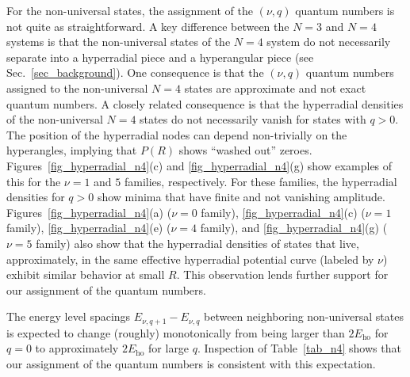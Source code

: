 \documentclass[aps,pra,twocolumn,showpacs,superscriptaddress]{revtex4}
\begin{document}
For the non-universal states,
the assignment of the $(\nu,q)$ quantum numbers is
not quite as straightforward.
A key difference between the $N=3$ and $N=4$ systems is that
the non-universal states of the $N=4$ system do not
necessarily separate into a hyperradial piece and a hyperangular
piece (see Sec.~\ref{sec_background}).
One consequence is that the $(\nu,q)$
quantum numbers assigned to the non-universal
$N=4$ states are approximate
and not exact quantum numbers.
A closely related  consequence
is that the hyperradial densities of the non-universal
$N=4$ states do not necessarily vanish for states
with $q>0$. The position of the hyperradial nodes
can depend non-trivially on the hyperangles, implying that
$P(R)$
shows
``washed out'' zeroes.
Figures~\ref{fig_hyperradial_n4}(c)
and \ref{fig_hyperradial_n4}(g) show
examples of this for the
$\nu=1$ and $5$ families, respectively.
For these families, the hyperradial densities for $q>0$
show minima that have finite and not
vanishing amplitude.
Figures~\ref{fig_hyperradial_n4}(a) ($\nu=0$ family),
\ref{fig_hyperradial_n4}(c) ($\nu=1$ family),
\ref{fig_hyperradial_n4}(e) ($\nu=4$ family),
and
\ref{fig_hyperradial_n4}(g) ($\nu=5$ family)
also show that
the hyperradial densities of
states that live, approximately, 
in the same effective hyperradial potential curve 
(labeled by $\nu$) exhibit
similar behavior at small $R$.
This observation lends further support for our 
assignment of the quantum numbers.

The energy level spacings $E_{\nu,q+1}-E_{\nu,q}$
between neighboring non-universal states is
expected to
change (roughly) monotonically from being larger than
$2 E_{\text{ho}}$ for $q=0$ to approximately $2 E_{\text{ho}}$ for large
$q$.
Inspection of Table~\ref{tab_n4} shows that our assignment of the
quantum numbers is consistent with this expectation.
\end{document}

